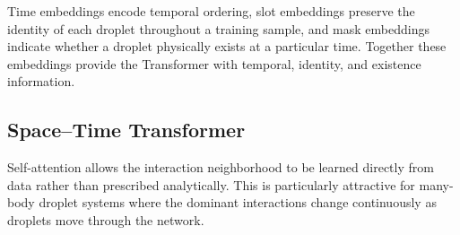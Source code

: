 \documentclass[11pt]{article}
\begin{document}
Time embeddings encode temporal ordering, slot embeddings preserve the identity of each droplet throughout a training sample, and mask embeddings indicate whether a droplet physically exists at a particular time. Together these embeddings provide the Transformer with temporal, identity, and existence information.

\subsection*{Space--Time Transformer}

Self-attention allows the interaction neighborhood to be learned directly from data rather than prescribed analytically. This is particularly attractive for many-body droplet systems where the dominant interactions change continuously as droplets move through the network.
\end{document}
